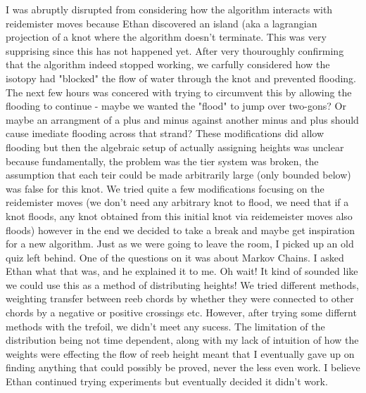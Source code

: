 \documentclass[11pt,oneside]{amsart}
\begin{document}
I was abruptly disrupted from considering how the algorithm interacts with reidemister moves because Ethan discovered an island (aka a lagrangian projection of a knot where the algorithm doesn't terminate. This was very supprising since this has not happened yet. After very thouroughly confirming that the algorithm indeed stopped working, we carfully considered how the isotopy had "blocked" the flow of water through the knot and prevented flooding. The next few hours was concered with trying to circumvent this by allowing the flooding to continue - maybe we wanted the "flood" to jump over two-gons? Or maybe an arrangment of a plus and minus against another minus and plus should cause imediate flooding across that strand? These modifications did allow flooding but then the algebraic setup of actually assigning heights was unclear because fundamentally, the problem was the tier system was broken, the assumption that each teir could be made arbitrarily large (only bounded below) was false for this knot. We tried quite a few modifications focusing on the reidemister moves (we don't need any arbitrary knot to flood, we need that if a knot floods, any knot obtained from this initial knot via reidemeister moves also floods) however in the end we decided to take a break and maybe get inspiration for a new algorithm. Just as we were going to leave the room, I picked up an old quiz left behind. One of the questions on it was about Markov Chains. I asked Ethan what that was, and he explained it to me. Oh wait! It kind of sounded like we could use this as a method of distributing heights! We tried different methods, weighting transfer between reeb chords by whether they were connected to other chords by a negative or positive crossings etc. However, after trying some differnt methods with the trefoil, we didn't meet any sucess. The limitation of the distribution being not time dependent, along with my lack of intuition of how the weights were effecting the flow of reeb height meant that I eventually gave up on finding anything that could possibly be proved, never the less even work. I believe Ethan continued trying experiments but eventually decided it didn't work.
\end{document}
